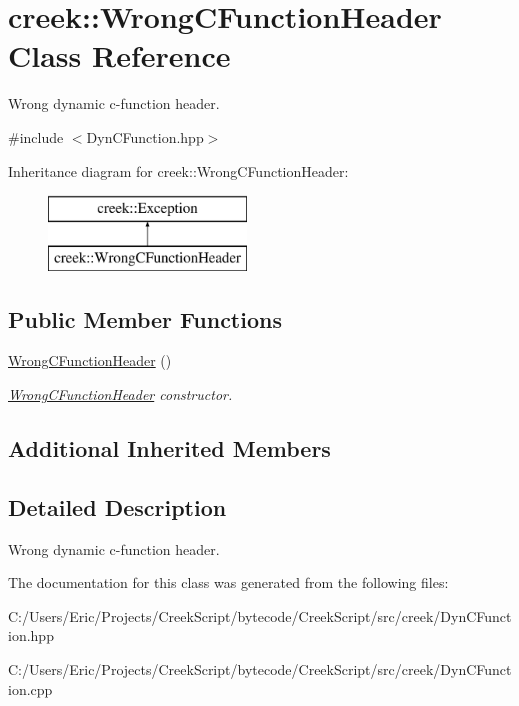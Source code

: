 \hypertarget{classcreek_1_1_wrong_c_function_header}{}\section{creek\+:\+:Wrong\+C\+Function\+Header Class Reference}
\label{classcreek_1_1_wrong_c_function_header}


Wrong dynamic c-\/function header.  




{\ttfamily \#include $<$Dyn\+C\+Function.\+hpp$>$}

Inheritance diagram for creek\+:\+:Wrong\+C\+Function\+Header\+:\begin{figure}[H]
\begin{center}
\leavevmode
\includegraphics[height=2.000000cm]{classcreek_1_1_wrong_c_function_header}
\end{center}
\end{figure}
\subsection*{Public Member Functions}
\begin{DoxyCompactItemize}
\item 
\hyperlink{classcreek_1_1_wrong_c_function_header_a745cadb1454184ec803d1089a558ebf0}{Wrong\+C\+Function\+Header} ()\hypertarget{classcreek_1_1_wrong_c_function_header_a745cadb1454184ec803d1089a558ebf0}{}\label{classcreek_1_1_wrong_c_function_header_a745cadb1454184ec803d1089a558ebf0}

\begin{DoxyCompactList}\small\item\em {\ttfamily \hyperlink{classcreek_1_1_wrong_c_function_header}{Wrong\+C\+Function\+Header}} constructor. \end{DoxyCompactList}\end{DoxyCompactItemize}
\subsection*{Additional Inherited Members}


\subsection{Detailed Description}
Wrong dynamic c-\/function header. 

The documentation for this class was generated from the following files\+:\begin{DoxyCompactItemize}
\item 
C\+:/\+Users/\+Eric/\+Projects/\+Creek\+Script/bytecode/\+Creek\+Script/src/creek/Dyn\+C\+Function.\+hpp\item 
C\+:/\+Users/\+Eric/\+Projects/\+Creek\+Script/bytecode/\+Creek\+Script/src/creek/Dyn\+C\+Function.\+cpp\end{DoxyCompactItemize}
